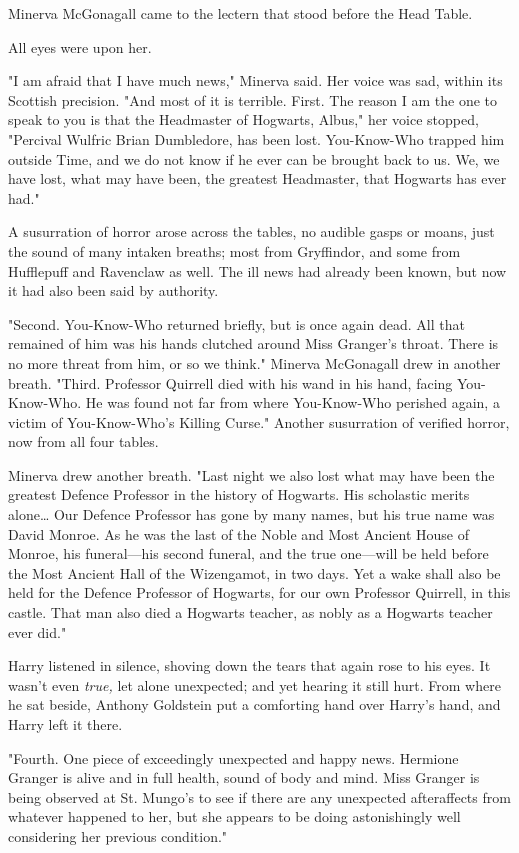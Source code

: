 Minerva McGonagall came to the lectern that stood before the Head Table.

All eyes were upon her.

"I am afraid that I have much news," Minerva said. Her voice was sad, within
its Scottish precision. "And most of it is terrible. First. The reason I am the
one to speak to you is that the Headmaster of Hogwarts, Albus," her voice
stopped, "Percival Wulfric Brian Dumbledore, has been lost. You-Know-Who
trapped him outside Time, and we do not know if he ever can be brought back to
us. We, we have lost, what may have been, the greatest Headmaster, that
Hogwarts has ever had."

A susurration of horror arose across the tables, no audible gasps or moans,
just the sound of many intaken breaths; most from Gryffindor, and some from
Hufflepuff and Ravenclaw as well. The ill news had already been known, but now
it had also been said by authority.

"Second. You-Know-Who returned briefly, but is once again dead. All that
remained of him was his hands clutched around Miss Granger's throat. There is
no more threat from him, or so we think." Minerva McGonagall drew in another
breath. "Third. Professor Quirrell died with his wand in his hand, facing
You-Know-Who. He was found not far from where You-Know-Who perished again, a
victim of You-Know-Who's Killing Curse." Another susurration of verified
horror, now from all four tables.

Minerva drew another breath. "Last night we also lost what may have been the
greatest Defence Professor in the history of Hogwarts. His scholastic merits
alone{\ldots} Our Defence Professor has gone by many names, but his true name
was David Monroe. As he was the last of the Noble and Most Ancient House of
Monroe, his funeral---his second funeral, and the true one---will be held
before the Most Ancient Hall of the Wizengamot, in two days. Yet a wake shall
also be held for the Defence Professor of Hogwarts, for our own Professor
Quirrell, in this castle. That man also died a Hogwarts teacher, as nobly as a
Hogwarts teacher ever did."

Harry listened in silence, shoving down the tears that again rose to his eyes.
It wasn't even \emph{true,} let alone unexpected; and yet hearing it still
hurt. From where he sat beside, Anthony Goldstein put a comforting hand over
Harry's hand, and Harry left it there.

"Fourth. One piece of exceedingly unexpected and happy news. Hermione Granger
is alive and in full health, sound of body and mind. Miss Granger is being
observed at St. Mungo's to see if there are any unexpected afteraffects from
whatever happened to her, but she appears to be doing astonishingly well
considering her previous condition."


